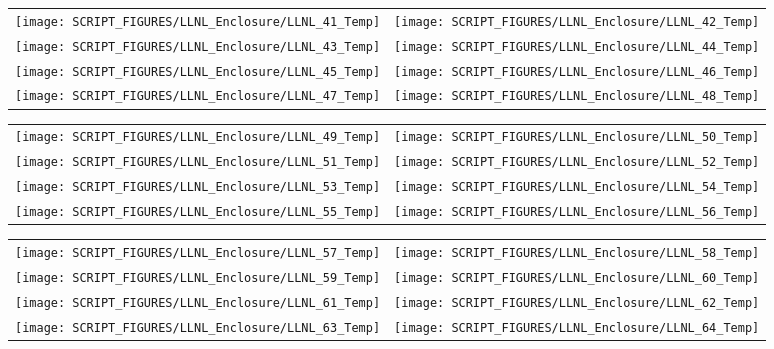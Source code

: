 \begin{figure}[p]
\begin{tabular*}{\textwidth}{l@{\extracolsep{\fill}}r}
\texttt{[image: SCRIPT\_FIGURES/LLNL\_Enclosure/LLNL\_41\_Temp]} &
\texttt{[image: SCRIPT\_FIGURES/LLNL\_Enclosure/LLNL\_42\_Temp]} \\
\texttt{[image: SCRIPT\_FIGURES/LLNL\_Enclosure/LLNL\_43\_Temp]} &
\texttt{[image: SCRIPT\_FIGURES/LLNL\_Enclosure/LLNL\_44\_Temp]} \\
\texttt{[image: SCRIPT\_FIGURES/LLNL\_Enclosure/LLNL\_45\_Temp]} &
\texttt{[image: SCRIPT\_FIGURES/LLNL\_Enclosure/LLNL\_46\_Temp]} \\
\texttt{[image: SCRIPT\_FIGURES/LLNL\_Enclosure/LLNL\_47\_Temp]} &
\texttt{[image: SCRIPT\_FIGURES/LLNL\_Enclosure/LLNL\_48\_Temp]}
\end{tabular*}
\label{LLNL_Enclosure_Temp_6}
\end{figure}

\begin{figure}[p]
\begin{tabular*}{\textwidth}{l@{\extracolsep{\fill}}r}
\texttt{[image: SCRIPT\_FIGURES/LLNL\_Enclosure/LLNL\_49\_Temp]} &
\texttt{[image: SCRIPT\_FIGURES/LLNL\_Enclosure/LLNL\_50\_Temp]} \\
\texttt{[image: SCRIPT\_FIGURES/LLNL\_Enclosure/LLNL\_51\_Temp]} &
\texttt{[image: SCRIPT\_FIGURES/LLNL\_Enclosure/LLNL\_52\_Temp]} \\
\texttt{[image: SCRIPT\_FIGURES/LLNL\_Enclosure/LLNL\_53\_Temp]} &
\texttt{[image: SCRIPT\_FIGURES/LLNL\_Enclosure/LLNL\_54\_Temp]} \\
\texttt{[image: SCRIPT\_FIGURES/LLNL\_Enclosure/LLNL\_55\_Temp]} &
\texttt{[image: SCRIPT\_FIGURES/LLNL\_Enclosure/LLNL\_56\_Temp]}
\end{tabular*}
\label{LLNL_Enclosure_Temp_7}
\end{figure}

\begin{figure}[p]
\begin{tabular*}{\textwidth}{l@{\extracolsep{\fill}}r}
\texttt{[image: SCRIPT\_FIGURES/LLNL\_Enclosure/LLNL\_57\_Temp]} &
\texttt{[image: SCRIPT\_FIGURES/LLNL\_Enclosure/LLNL\_58\_Temp]} \\
\texttt{[image: SCRIPT\_FIGURES/LLNL\_Enclosure/LLNL\_59\_Temp]} &
\texttt{[image: SCRIPT\_FIGURES/LLNL\_Enclosure/LLNL\_60\_Temp]} \\
\texttt{[image: SCRIPT\_FIGURES/LLNL\_Enclosure/LLNL\_61\_Temp]} &
\texttt{[image: SCRIPT\_FIGURES/LLNL\_Enclosure/LLNL\_62\_Temp]} \\
\texttt{[image: SCRIPT\_FIGURES/LLNL\_Enclosure/LLNL\_63\_Temp]} &
\texttt{[image: SCRIPT\_FIGURES/LLNL\_Enclosure/LLNL\_64\_Temp]}
\end{tabular*}
\label{LLNL_Enclosure_Temp_8}
\end{figure}

